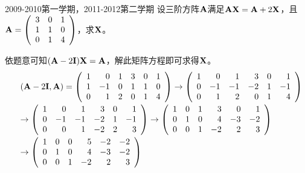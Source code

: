 \begin{frame}
\begin{footnotesize}
\begin{exampleblock}{2009-2010第一学期，2011-2012第二学期}
设三阶方阵$\mathbf{A}$满足$\mathbf{A}\mathbf{X}=\mathbf{A}+2\mathbf{X}$，且$\mathbf{A}=\left(
\begin{array}{rrr}
3&0&1\\
1&1&0\\
0&1&4
\end{array}
\right)$，求$\mathbf{X}$。
\end{exampleblock}
\pause\jiename
依题意可知$(\mathbf{A}-2\mathbf{I})\mathbf{X}=\mathbf{A}$，解此矩阵方程即可求得$\mathbf{X}$。\pause 
$$
\begin{array}{rl}
&(\mathbf{A}-2\mathbf{I}, \mathbf{A})=\left(
\begin{array}{rrrrrr}
  1&0&1&3&0&1\\
  1&-1&0&1&1&0\\
  0&1&2&0&1&4
\end{array}
\right)\rightarrow\left(
\begin{array}{rrrrrr}
  1&0&1&3&0&1\\
  0&-1&-1&-2&1&-1\\
  0&1&2&0&1&4
\end{array}
\right)\\[0.2in]
&\rightarrow\left(
\begin{array}{rrrrrr}
  1&0&1&3&0&1\\
  0&-1&-1&-2&1&-1\\
  0&0&1&-2&2&3
\end{array}
\right)\rightarrow\left(
\begin{array}{rrrrrr}
  1&0&1&3&0&1\\
  0&1&0&4&-3&-2\\
  0&0&1&-2&2&3
\end{array}
\right)\\[0.2in]
&\rightarrow\left(
\begin{array}{rrrrrr}
  1&0&0&5&-2&-2\\
  0&1&0&4&-3&-2\\
  0&0&1&-2&2&3
\end{array}
\right)
\end{array}
$$
\end{footnotesize}
\end{frame}


